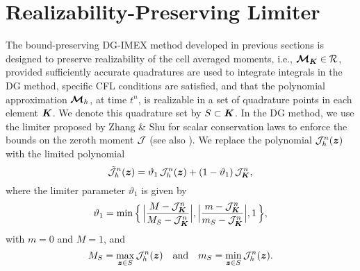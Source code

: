 \section{Realizability-Preserving Limiter}
\label{eq:limiter}

The bound-preserving DG-IMEX method developed in previous sections is designed to preserve realizability of the cell averaged moments, i.e., $\boldsymbol{\mathcal{M}}_{\boldsymbol{K}}\in\mathcal{R}$, provided sufficiently accurate quadratures are used to integrate integrals in the DG method, specific CFL conditions are satisfied, and that the polynomial approximation $\boldsymbol{\mathcal{M}}_{h}$, at time $t^{n}$, is realizable in a set of quadrature points in each element $\boldsymbol{K}$.  
We denote this quadrature set by $S\subset\boldsymbol{K}$.  
In the DG method, we use the limiter proposed by Zhang \& Shu \cite{zhangShu_2010a} for scalar conservation laws to enforce the bounds on the zeroth moment $\mathcal{J}$ (see also \cite{liuOsher_1996}).  
We replace the polynomial $\mathcal{J}_{h}^{n}(\boldsymbol{z})$ with the limited polynomial
\begin{equation}
  \tilde{\mathcal{J}}_{h}^{n}(\boldsymbol{z})
  =\vartheta_{1}\,\mathcal{J}_{h}^{n}(\boldsymbol{z})+(1-\vartheta_{1})\,\mathcal{J}_{\boldsymbol{K}}^{n},
\end{equation}
where the limiter parameter $\vartheta_{1}$ is given by
\begin{equation}
  \vartheta_{1}
  =\min\Big\{\,\Big|\frac{M-\mathcal{J}_{\boldsymbol{K}}^{n}}{M_{S}-\mathcal{J}_{\boldsymbol{K}}^{n}}\Big|,\Big|\frac{m-\mathcal{J}_{\boldsymbol{K}}^{n}}{m_{S}-\mathcal{J}_{\boldsymbol{K}}^{n}}\Big|,1\,\Big\},
\end{equation}
with $m=0$ and $M=1$, and
\begin{equation}
  M_{S}=\max_{\boldsymbol{z}\in S}\mathcal{J}_{h}^{n}(\boldsymbol{z})
  \quad\text{and}\quad
  m_{S}=\min_{\boldsymbol{z}\in S}\mathcal{J}_{h}^{n}(\boldsymbol{z}).  
\end{equation}

